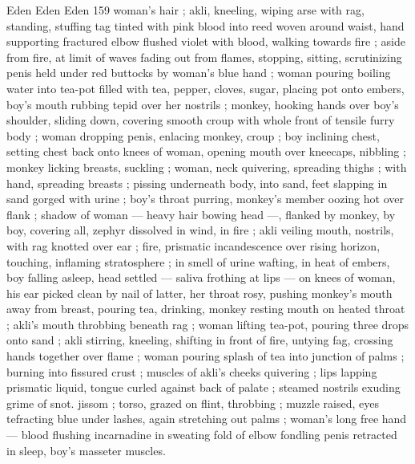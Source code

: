 Eden Eden Eden 159
woman's hair ; akli, kneeling, wiping arse with rag, standing, stuffing
tag tinted with pink blood into reed woven around waist, hand
supporting fractured elbow flushed violet with blood, walking
towards fire ; aside from fire, at limit of waves fading out from
flames, stopping, sitting, scrutinizing penis held under red buttocks
by woman's blue hand ; woman pouring boiling water into tea-pot
filled with tea, pepper, cloves, sugar, placing pot onto embers, boy's
mouth rubbing tepid over her nostrils ; monkey, hooking hands over
boy's shoulder, sliding down, covering smooth croup with whole front
of tensile furry body ; woman dropping penis, enlacing monkey,
croup ; boy inclining chest, setting chest back onto knees of woman,
opening mouth over kneecaps, nibbling ; monkey licking breasts,
suckling ; woman, neck quivering, spreading thighs ; with hand,
spreading breasts ; pissing underneath body, into sand, feet
slapping in sand gorged with urine ; boy's throat purring, monkey's
member oozing hot over flank ; shadow of woman — heavy hair
bowing head —, flanked by monkey, by boy, covering all, zephyr
dissolved in wind, in fire ; akli veiling mouth, nostrils, with rag
knotted over ear ; fire, prismatic incandescence over rising horizon,
touching, inflaming stratosphere ; in smell of urine wafting, in heat
of embers, boy falling asleep, head settled — saliva frothing at lips
— on knees of woman, his ear picked clean by nail of latter, her
throat rosy, pushing monkey's mouth away from breast, pouring tea,
drinking, monkey resting mouth on heated throat ; akli’s mouth
throbbing beneath rag ; woman lifting tea-pot, pouring three drops
onto sand ; akli stirring, kneeling, shifting in front of fire, untying
fag, crossing hands together over flame ; woman pouring splash of
tea into junction of palms ; burning into fissured crust ; muscles of
akli's cheeks quivering ; lips lapping prismatic liquid, tongue curled
against back of palate ; steamed nostrils exuding grime of snot.
jissom ; torso, grazed on flint, throbbing ; muzzle raised, eyes
tefracting blue under lashes, again stretching out palms ; woman's
long free hand — blood flushing incarnadine in sweating fold of
elbow fondling penis retracted in sleep, boy’s masseter muscles.

